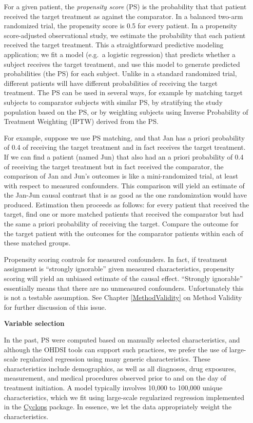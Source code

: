\documentclass[11pt]{book}
\begin{document}
For a given patient, the \emph{propensity score} (PS) is the probability
that that patient received the target treatment as against the
comparator. \citep{rosenbaum_1983} In a balanced two-arm randomized
trial, the propensity score is 0.5 for every patient. In a propensity
score-adjusted observational study, we estimate the probability that
each patient received the target treatment. This a straightforward
predictive modeling application; we fit a model (e.g.~a logistic
regression) that predicts whether a subject receives the target
treatment, and use this model to generate predicted probabilities (the
PS) for each subject. Unlike in a standard randomized trial, different
patients will have different probabilities of receiving the target
treatment. The PS can be used in several ways, for example by matching
target subjects to comparator subjects with similar PS, by stratifying
the study population based on the PS, or by weighting subjects using
Inverse Probability of Treatment Weighting (IPTW) derived from the PS.

For example, suppose we use PS matching, and that Jan has a priori
probability of 0.4 of receiving the target treatment and in fact
receives the target treatment. If we can find a patient (named Jun) that
also had an a priori probability of 0.4 of receiving the target
treatment but in fact received the comparator, the comparison of Jan and
Jun's outcomes is like a mini-randomized trial, at least with respect to
measured confounders. This comparison will yield an estimate of the
Jan-Jun causal contrast that is as good as the one randomization would
have produced. Estimation then proceeds as follows: for every patient
that received the target, find one or more matched patients that
received the comparator but had the same a priori probability of
receiving the target. Compare the outcome for the target patient with
the outcomes for the comparator patients within each of these matched
groups.

Propensity scoring controls for measured confounders. In fact, if
treatment assignment is ``strongly ignorable'' given measured
characteristics, propensity scoring will yield an unbiased estimate of
the causal effect. ``Strongly ignorable'' essentially means that there
are no unmeasured confounders. Unfortunately this is not a testable
assumption. See Chapter \ref{MethodValidity} on Method Validity for
further discussion of this issue.

\textbf{Variable selection}

In the past, PS were computed based on manually selected
characteristics, and although the OHDSI tools can support such
practices, we prefer the use of large-scale regularized regression using
many generic characteristics. \citep{tian_2018} These characteristics
include demographics, as well as all diagnoses, drug exposures,
measurement, and medical procedures observed prior to and on the day of
treatment initiation. A model typically involves 10,000 to 100,000
unique characteristics, which we fit using large-scale regularized
regression \citep{suchard_2013} implemented in the
\href{https://ohdsi.github.io/Cyclops/}{Cyclops} package. In essence, we
let the data appropriately weight the characteristics.
\end{document}
